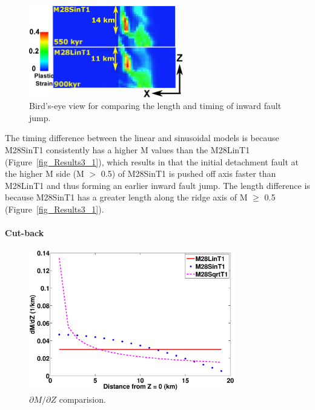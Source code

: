 \begin{figure}[h]
  \centering
    \includegraphics[width=0.6\textwidth]{./Figures/fig_Results4_2_secondary_fault_length_comparison1.eps}
  \caption{Bird's-eye view for comparing the length and timing of inward fault jump.}
 \label{fig_Results4_2}
\end{figure}   

The timing difference between the linear and sinusoidal models is because M28SinT1 consistently has a higher M values than the M28LinT1 (Figure~\hyperref[fig_Results3_1]{\ref{fig_Results3_1}}), which results in that the initial detachment fault at the higher M side (M $>$ 0.5) of M28SinT1 is pushed off axis faster than M28LinT1 and thus forming an earlier inward fault jump. The length difference is because M28SinT1 has a greater length along the ridge axis of M $\ge$ 0.5 (Figure~\hyperref[fig_Results3_1]{\ref{fig_Results3_1}}). 

\paragraph{Cut-back}

\begin{figure}[h]
  \centering
    \includegraphics[width=0.8\textwidth]{./Figures/fig_Results_3_3_1_M_type_plot_dM_dZ.eps}
  \caption{$\partial M/ \partial Z$ comparision.}
 \label{fig_Results_3_3_1_M_type_plot_dM_dZ}
\end{figure}  

